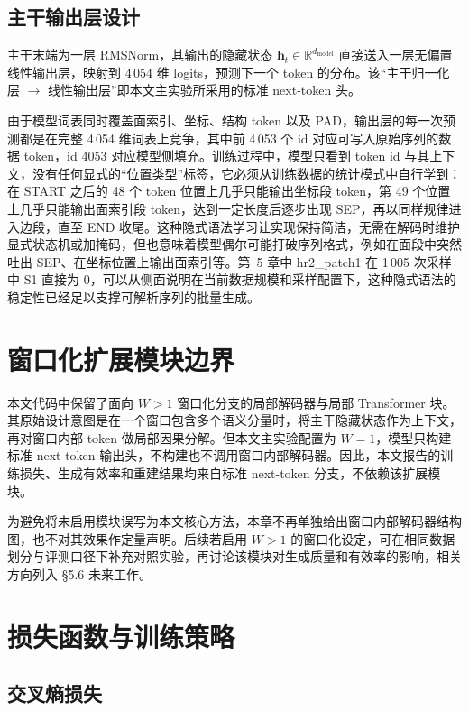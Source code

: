 \subsection{主干输出层设计}

主干末端为一层 RMSNorm，其输出的隐藏状态 $\mathbf{h}_t \in \mathbb{R}^{d_{\text{model}}}$ 直接送入一层无偏置线性输出层，映射到 4\,054 维 logits，预测下一个 token 的分布。该“主干归一化层 $\to$ 线性输出层”即本文主实验所采用的标准 next-token 头。

由于模型词表同时覆盖面索引、坐标、结构 token 以及 PAD，输出层的每一次预测都是在完整 4\,054 维词表上竞争，其中前 4\,053 个 id 对应可写入原始序列的数据 token，id 4053 对应模型侧填充。训练过程中，模型只看到 token id 与其上下文，没有任何显式的“位置类型”标签，它必须从训练数据的统计模式中自行学到：在 START 之后的 48 个 token 位置上几乎只能输出坐标段 token，第 49 个位置上几乎只能输出面索引段 token，达到一定长度后逐步出现 SEP，再以同样规律进入边段，直至 END 收尾。这种隐式语法学习让实现保持简洁，无需在解码时维护显式状态机或加掩码，但也意味着模型偶尔可能打破序列格式，例如在面段中突然吐出 SEP、在坐标位置上输出面索引等。第~5 章中 hr2\_patch1 在 1\,005 次采样中 S1 直接为 0，可以从侧面说明在当前数据规模和采样配置下，这种隐式语法的稳定性已经足以支撑可解析序列的批量生成。

\section{窗口化扩展模块边界}

\begin{sloppypar}
本文代码中保留了面向 $W > 1$ 窗口化分支的局部解码器与局部 Transformer 块。其原始设计意图是在一个窗口包含多个语义分量时，将主干隐藏状态作为上下文，再对窗口内部 token 做局部因果分解。但本文主实验配置为 $W = 1$，模型只构建标准 next-token 输出头，不构建也不调用窗口内部解码器。因此，本文报告的训练损失、生成有效率和重建结果均来自标准 next-token 分支，不依赖该扩展模块。
\end{sloppypar}

为避免将未启用模块误写为本文核心方法，本章不再单独给出窗口内部解码器结构图，也不对其效果作定量声明。后续若启用 $W > 1$ 的窗口化设定，可在相同数据划分与评测口径下补充对照实验，再讨论该模块对生成质量和有效率的影响，相关方向列入 §5.6 未来工作。

\section{损失函数与训练策略}

\subsection{交叉熵损失}

